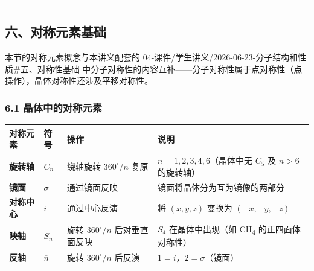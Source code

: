 \documentclass[a4paper,11pt]{ctexart}
\newcounter{none}
\begin{document}
\begin{center}\rule{0.5\linewidth}{0.5pt}\end{center}

\subsection{六、对称元素基础}\label{ux516dux5bf9ux79f0ux5143ux7d20ux57faux7840}

本节的对称元素概念与本讲义配套的 04-课件/学生讲义/2026-06-23-分子结构和性质\#五、对称性基础 中分子对称性的内容互补------分子对称性属于点对称性（点操作），晶体对称性还涉及平移对称性。

\subsubsection{6.1 晶体中的对称元素}\label{ux6676ux4f53ux4e2dux7684ux5bf9ux79f0ux5143ux7d20}

{\def\LTcaptype{none} %
\begin{longtable}[]{@{}
  >{\centering\arraybackslash}p{}
  >{\centering\arraybackslash}p{}
  >{\raggedright\arraybackslash}p{}
  >{\raggedright\arraybackslash}p{}@{}}
\toprule\noalign{}
\begin{minipage}[b]{\linewidth}\centering
对称元素
\end{minipage} & \begin{minipage}[b]{\linewidth}\centering
符号
\end{minipage} & \begin{minipage}[b]{\linewidth}\raggedright
操作
\end{minipage} & \begin{minipage}[b]{\linewidth}\raggedright
说明
\end{minipage} \\
\midrule\noalign{}
\endhead
\bottomrule\noalign{}
\endlastfoot
\textbf{旋转轴} & \(C_n\) & 绕轴旋转 \(360^\circ/n\) 复原 & \(n = 1, 2, 3, 4, 6\)（晶体中无 \(C_5\) 及 \(n > 6\) 的旋转轴） \\
\textbf{镜面} & \(\sigma\) & 通过镜面反映 & 镜面将晶体分为互为镜像的两部分 \\
\textbf{对称中心} & \(i\) & 通过中心反演 & 将 \((x, y, z)\) 变换为 \((-x, -y, -z)\) \\
\textbf{映轴} & \(S_n\) & 旋转 \(360^\circ/n\) 后对垂直面反映 & \(S_4\) 在晶体中出现（如 CH\textsubscript{4} 的正四面体对称性） \\
\textbf{反轴} & \(\overline{n}\) & 旋转 \(360^\circ/n\) 后反演 & \(\overline{1} = i\)，\(\overline{2} = \sigma\)（镜面） \\
\end{longtable}
}
\end{document}
